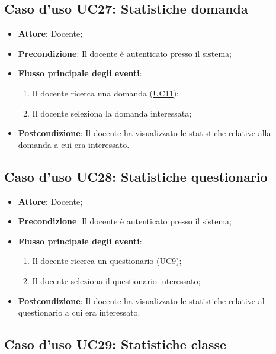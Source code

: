\documentclass[12pt,a4paper]{article}
\begin{document}
\subsection{Caso d'uso UC27: Statistiche domanda}

\begin{itemize}

\item \textbf{Attore}: Docente; 
\item \textbf{Precondizione}: Il docente è autenticato presso il sistema;

\item \textbf{Flusso principale degli eventi}:
\begin{enumerate}
	\item Il docente ricerca una domanda (\hyperlink{UC11}{UC11});
	\item Il docente seleziona la domanda interessata;
	
\end{enumerate}
\item \textbf{Postcondizione}: Il docente ha visualizzato le statistiche relative alla domanda a cui era interessato.
\end{itemize}
\hypertarget{UC28}{}
\subsection{Caso d'uso UC28: Statistiche questionario}

\begin{itemize}

\item \textbf{Attore}: Docente; 
\item \textbf{Precondizione}: Il docente è autenticato presso il sistema;

\item \textbf{Flusso principale degli eventi}:
\begin{enumerate}
	\item Il docente ricerca un questionario (\hyperlink{UC9}{UC9});
	\item Il docente seleziona il questionario interessato;
	
\end{enumerate}
\item \textbf{Postcondizione}: Il docente ha visualizzato le statistiche relative al questionario a cui era interessato.
\end{itemize}
\hypertarget{UC29}{}
\subsection{Caso d'uso UC29: Statistiche classe}
\end{document}
